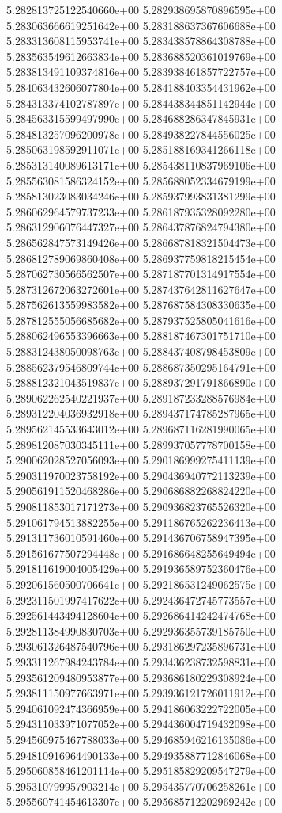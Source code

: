 5.282813725122540660e+00
5.282938695870896595e+00
5.283063666619251642e+00
5.283188637367606688e+00
5.283313608115953741e+00
5.283438578864308788e+00
5.283563549612663834e+00
5.283688520361019769e+00
5.283813491109374816e+00
5.283938461857722757e+00
5.284063432606077804e+00
5.284188403354431962e+00
5.284313374102787897e+00
5.284438344851142944e+00
5.284563315599497990e+00
5.284688286347845931e+00
5.284813257096200978e+00
5.284938227844556025e+00
5.285063198592911071e+00
5.285188169341266118e+00
5.285313140089613171e+00
5.285438110837969106e+00
5.285563081586324152e+00
5.285688052334679199e+00
5.285813023083034246e+00
5.285937993831381299e+00
5.286062964579737233e+00
5.286187935328092280e+00
5.286312906076447327e+00
5.286437876824794380e+00
5.286562847573149426e+00
5.286687818321504473e+00
5.286812789069860408e+00
5.286937759818215454e+00
5.287062730566562507e+00
5.287187701314917554e+00
5.287312672063272601e+00
5.287437642811627647e+00
5.287562613559983582e+00
5.287687584308330635e+00
5.287812555056685682e+00
5.287937525805041616e+00
5.288062496553396663e+00
5.288187467301751710e+00
5.288312438050098763e+00
5.288437408798453809e+00
5.288562379546809744e+00
5.288687350295164791e+00
5.288812321043519837e+00
5.288937291791866890e+00
5.289062262540221937e+00
5.289187233288576984e+00
5.289312204036932918e+00
5.289437174785287965e+00
5.289562145533643012e+00
5.289687116281990065e+00
5.289812087030345111e+00
5.289937057778700158e+00
5.290062028527056093e+00
5.290186999275411139e+00
5.290311970023758192e+00
5.290436940772113239e+00
5.290561911520468286e+00
5.290686882268824220e+00
5.290811853017171273e+00
5.290936823765526320e+00
5.291061794513882255e+00
5.291186765262236413e+00
5.291311736010591460e+00
5.291436706758947395e+00
5.291561677507294448e+00
5.291686648255649494e+00
5.291811619004005429e+00
5.291936589752360476e+00
5.292061560500706641e+00
5.292186531249062575e+00
5.292311501997417622e+00
5.292436472745773557e+00
5.292561443494128604e+00
5.292686414242474768e+00
5.292811384990830703e+00
5.292936355739185750e+00
5.293061326487540796e+00
5.293186297235896731e+00
5.293311267984243784e+00
5.293436238732598831e+00
5.293561209480953877e+00
5.293686180229308924e+00
5.293811150977663971e+00
5.293936121726011912e+00
5.294061092474366959e+00
5.294186063222722005e+00
5.294311033971077052e+00
5.294436004719432098e+00
5.294560975467788033e+00
5.294685946216135086e+00
5.294810916964490133e+00
5.294935887712846068e+00
5.295060858461201114e+00
5.295185829209547279e+00
5.295310799957903214e+00
5.295435770706258261e+00
5.295560741454613307e+00
5.295685712202969242e+00
